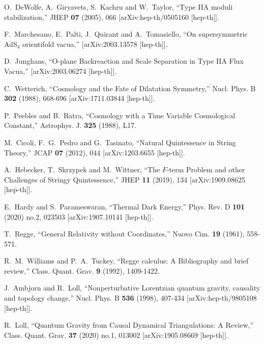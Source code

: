 \documentclass[12pt]{article}
\numberwithin{equation}{section}
\begin{document}
\begin{thebibliography}{999}
O.~DeWolfe, A.~Giryavets, S.~Kachru and W.~Taylor,
``Type IIA moduli stabilization,''
JHEP \textbf{07} (2005), 066
[arXiv:hep-th/0505160 [hep-th]].

F.~Marchesano, E.~Palti, J.~Quirant and A.~Tomasiello,
``On supersymmetric AdS$_4$ orientifold vacua,''
[arXiv:2003.13578 [hep-th]].

D.~Junghans,
``O-plane Backreaction and Scale Separation in Type IIA Flux Vacua,''
[arXiv:2003.06274 [hep-th]].

C.~Wetterich,
``Cosmology and the Fate of Dilatation Symmetry,''
Nucl. Phys. B \textbf{302} (1988), 668-696
[arXiv:1711.03844 [hep-th]].

P.~Peebles and B.~Ratra,
``Cosmology with a Time Variable Cosmological Constant,''
Astrophys. J. \textbf{325} (1988), L17.

M.~Cicoli, F.~G.~Pedro and G.~Tasinato,
``Natural Quintessence in String Theory,''
JCAP \textbf{07} (2012), 044
[arXiv:1203.6655 [hep-th]].

A.~Hebecker, T.~Skrzypek and M.~Wittner,
``The $F$-term Problem and other Challenges of Stringy Quintessence,''
JHEP \textbf{11} (2019), 134
[arXiv:1909.08625 [hep-th]].

E.~Hardy and S.~Parameswaran,
``Thermal Dark Energy,''
Phys. Rev. D \textbf{101} (2020) no.2, 023503
[arXiv:1907.10141 [hep-th]].

T.~Regge,
``General Relativity without Coordinates,''
Nuovo Cim. \textbf{19} (1961), 558-571.

R.~M.~Williams and P.~A.~Tuckey,
``Regge calculus: A Bibliography and brief review,''
Class. Quant. Grav. \textbf{9} (1992), 1409-1422.

J.~Ambjorn and R.~Loll,
``Nonperturbative Lorentzian quantum gravity, causality and topology change,''
Nucl. Phys. B \textbf{536} (1998), 407-434
[arXiv:hep-th/9805108 [hep-th]].

R.~Loll,
``Quantum Gravity from Causal Dynamical Triangulations: A Review,''
Class. Quant. Grav. \textbf{37} (2020) no.1, 013002
[arXiv:1905.08669 [hep-th]].


\end{thebibliography}
\end{document}
